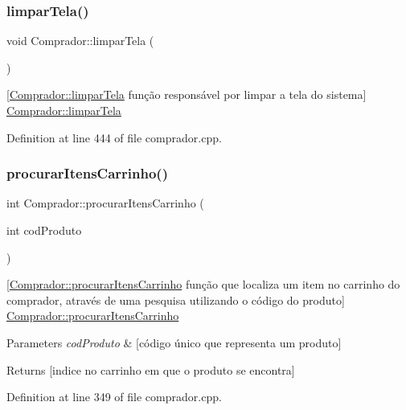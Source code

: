 \subsubsection{\texorpdfstring{limpar\+Tela()}{limparTela()}}
{\footnotesize\ttfamily void Comprador\+::limpar\+Tela (\begin{DoxyParamCaption}{ }\end{DoxyParamCaption})}

\mbox{[}\hyperlink{class_comprador_a511093b891d5c4202cee1f25ccbed66e}{Comprador\+::limpar\+Tela} função responsável por limpar a tela do sistema\mbox{]}  \hyperlink{class_comprador_a511093b891d5c4202cee1f25ccbed66e}{Comprador\+::limpar\+Tela} 

Definition at line 444 of file comprador.\+cpp.

\mbox{\label{class_comprador_a5b8bcd0a0576385fd5614be8a3b2160b}} 
\subsubsection{\texorpdfstring{procurar\+Itens\+Carrinho()}{procurarItensCarrinho()}}
{\footnotesize\ttfamily int Comprador\+::procurar\+Itens\+Carrinho (\begin{DoxyParamCaption}\item[{int}]{cod\+Produto }\end{DoxyParamCaption})}

\mbox{[}\hyperlink{class_comprador_a5b8bcd0a0576385fd5614be8a3b2160b}{Comprador\+::procurar\+Itens\+Carrinho} função que localiza um item no carrinho do comprador, através de uma pesquisa utilizando o código do produto\mbox{]}  \hyperlink{class_comprador_a5b8bcd0a0576385fd5614be8a3b2160b}{Comprador\+::procurar\+Itens\+Carrinho} 
\begin{DoxyParams}{Parameters}
{\em cod\+Produto} & \mbox{[}código único que representa um produto\mbox{]} \\
\hline
\end{DoxyParams}
\begin{DoxyReturn}{Returns}
\mbox{[}indice no carrinho em que o produto se encontra\mbox{]} 
\end{DoxyReturn}


Definition at line 349 of file comprador.\+cpp.

\mbox{\label{class_comprador_a0ebab4be27f71b04734794765d661529}} 
